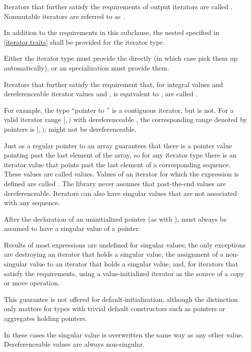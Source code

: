 \pnum
Iterators that further satisfy the requirements of output iterators are
called . Nonmutable iterators are referred to
as .

\pnum
In addition to the requirements in this subclause,
the nested  specified in \ref{iterator.traits}
shall be provided for the iterator type.
\begin{note} Either the iterator type must provide the  directly
(in which case  pick them up automatically), or
an  specialization must provide them. \end{note}

\begin{removedblock}
\pnum
Iterators that further satisfy the requirement that,
for integral values  and
dereferenceable iterator values  and ,
 is equivalent to ,
are called .
\begin{note}
For example, the type ``pointer to '' is a contiguous iterator,
but  is not.
For a valid iterator range $[$$, $$)$ with dereferenceable ,
the corresponding range denoted by pointers is
$[$$, $$)$;
 might not be dereferenceable.
\end{note}
\end{removedblock}

\pnum
Just as a regular pointer to an array guarantees that there is a pointer value pointing past the last element
of the array, so for any iterator type there is an iterator value that points past the last element of a
corresponding sequence.
These values are called
values.
Values of an iterator
for which the expression
is defined are called
.
The library never assumes that past-the-end values are dereferenceable.
Iterators can also have singular values that are not associated with any
sequence.
\begin{example}
After the declaration of an uninitialized pointer
(as with
),
must always be assumed to have a singular value of a pointer.
\end{example}
Results of most expressions are undefined for singular values;
the only exceptions are destroying an iterator that holds a singular value,
the assignment of a non-singular value to
an iterator that holds a singular value, and, for iterators that satisfy the
 requirements, using a value-initialized iterator
as the source of a copy or move operation. \begin{note} This guarantee is not
offered for default-initialization, although the distinction only matters for types
with trivial default constructors such as pointers or aggregates holding pointers.
\end{note}
In these cases the singular
value is overwritten the same way as any other value.
Dereferenceable
values are always non-singular.


